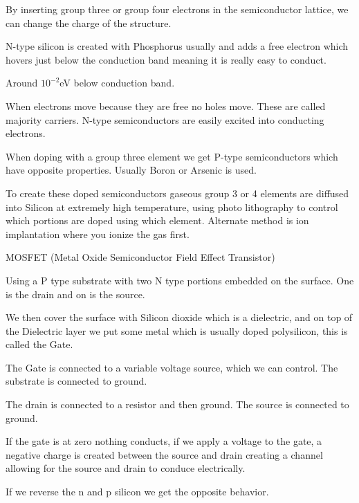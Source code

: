 \documentclass{report}
\begin{document}
\begin{description}
\begin{mdframed}
            By inserting group three or group four electrons
            in the semiconductor lattice, we can change the
            charge of the structure.

            N-type silicon is created with Phosphorus usually
            and adds a free electron which hovers just below the
            conduction band meaning it is really easy to conduct.

            Around $10^{-2}$eV below conduction band.

            When electrons move because they are free no holes move.
            These are called majority carriers. N-type semiconductors
            are easily excited into conducting electrons.

            When doping with a group three element we get P-type
            semiconductors which have opposite properties. Usually
            Boron or Arsenic is used.

            To create these doped semiconductors gaseous group 3 or 4
            elements are diffused into Silicon at extremely high temperature,
            using photo lithography to control which portions are
            doped using which element. Alternate method is ion implantation
            where you ionize the gas first.

        \end{mdframed}
        \pagebreak
    \item MOSFET (Metal Oxide Semiconductor Field Effect Transistor)
        \begin{mdframed}
            Using a P type substrate with two  
            N type portions embedded on the surface. One is the
            drain and on is the source.

            We then cover the surface with Silicon dioxide which
            is a dielectric, and on top of the Dielectric layer
            we put some metal which is usually doped polysilicon,
            this is called the Gate.

            The Gate is connected to a variable voltage source,
            which we can control. The substrate is connected
            to ground.

            The drain is connected to a resistor and then ground.
            The source is connected to ground.

            If the gate is at zero nothing conducts, if we 
            apply a voltage to the gate, a negative charge
            is created between the source and drain creating
            a channel allowing for the source and drain
            to conduce electrically.

            If we reverse the n and p silicon we get the opposite
            behavior.
        \end{mdframed}
\end{description}
\end{document}
